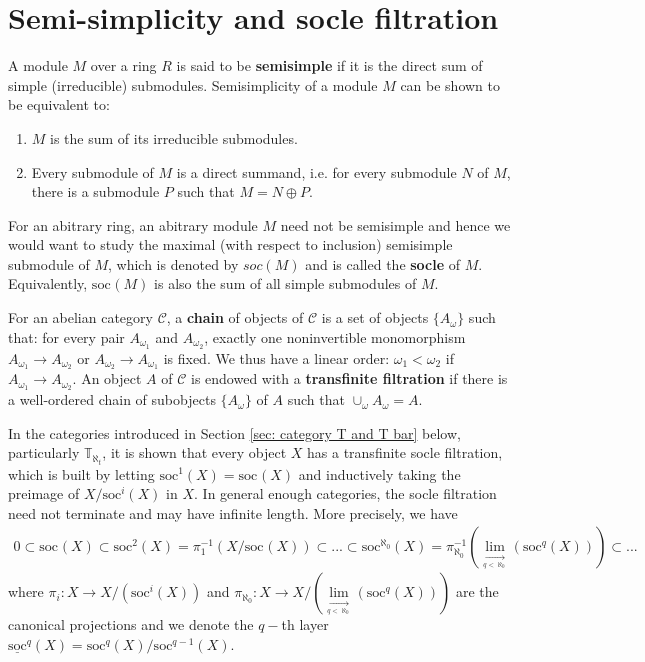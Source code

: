 \documentclass[openany, a4paper]{amsbook}
\theoremstyle{definition}
\numberwithin{equation}{chapter}
\newcommand{\T}[1]{{\mathbb{T}}_{\aleph_{#1}}}
\newcommand{\socl}[2]{\underline{\mathrm{soc}}^{#1}({#2})}
\newcommand{\soc}[2]{\mathrm{soc}^{#1}({#2})}
\begin{document}
\section{Semi-simplicity and socle filtration}
A module $M$ over a ring $R$ is said to be \textbf{semisimple} if it is the direct sum of simple (irreducible) submodules. Semisimplicity of a module $M$ can be shown \cite{lang} to be equivalent to:
\begin{enumerate}
    \item $M$ is the sum of its irreducible submodules.
    \item Every submodule of $M$ is a direct summand, i.e. for every submodule $N$ of $M$, there is a submodule $P$ such that $M = N \oplus P$.
\end{enumerate}

For an abitrary ring, an abitrary module $M$ need not be semisimple and hence we would want to study the maximal (with respect to inclusion) semisimple submodule of $M$, which is denoted by $soc(M)$ and is called the \textbf{socle} of $M$. Equivalently, $\soc{}{M}$ is also the sum of all simple submodules of $M$.

For an abelian category $\mathcal{C}$, a \textbf{chain} of objects of $\mathcal{C}$ is a set of objects $\{ A_\omega \}$ such that: for every pair $ A_{\omega_1} $ and $ A_{\omega_2}$, exactly one noninvertible monomorphism $A_{\omega_1} \to A_{\omega_2}$ or $A_{\omega_2} \to A_{\omega_1}$ is fixed. We thus have a linear order: $\omega_1 < \omega_2$ if $A_{\omega_1} \to A_{\omega_2}$. An object $A$ of $\mathcal{C}$ is endowed with a \textbf{transfinite filtration} if there is a well-ordered chain of subobjects $\{ A_\omega \}$ of $A$ such that $\cup_{\omega} A_\omega = A$.

In the categories introduced in Section \ref{sec: category T and T bar} below, particularly $\T{t}$, it is shown that every object $X$ has a transfinite socle filtration, which is built by letting $\soc{1}{X} = \soc{}{X}$ and inductively taking the preimage of $X/\soc{i}{X}$ in $X$. In general enough categories, the socle filtration need not terminate and may have infinite length. More precisely, we have
\begin{align*}
    0 \subset \soc{}{X} \subset \soc{2}{X} = \pi^{-1}_{1}(X/\soc{}{X}) \subset ... \subset \soc{\aleph_0}{X} = \pi^{-1}_{\aleph_0}
    (\lim_{ \xrightarrow[q < \aleph_0]{}} (\soc{q}{X}) )
    \subset ...
\end{align*}
where $\pi_i: X \to X/(\soc{i}{X})$ and 
$\pi_{\aleph_0}: X \to X/
(\lim\limits_{ \xrightarrow[q < \aleph_0]{} } (\soc{q}{X}))$ are the canonical projections and we denote the $q-$th layer $\socl{q}{X} = \soc{q}{X} / \soc{q-1}{X}$.  
\end{document}
